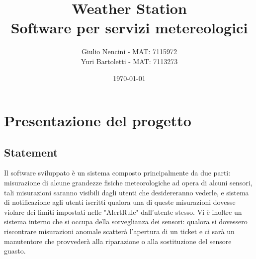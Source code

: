 \documentclass[a4paper, 11pt]{article}
\title{Weather Station
\\Software per servizi metereologici}
\author{Giulio Nencini - MAT: 7115972
\\Yuri Bartoletti - MAT: 7113273}
\date{\today}
\begin{document}
	\newpage
	\maketitle
	\tableofcontents

	\newpage
	\section{Presentazione del progetto}
	\subsection{Statement}
	Il software sviluppato è un sistema composto principalmente da due parti: misurazione di alcune grandezze fisiche meteorologiche ad opera di alcuni sensori, tali misurazioni saranno visibili dagli utenti che desidereranno vederle, e sistema di notificazione agli utenti iscritti qualora una di queste misurazioni dovesse violare dei limiti impostati nelle "AlertRule" dall'utente stesso. Vi è inoltre un sistema interno che si occupa della sorveglianza dei sensori: qualora si dovessero riscontrare misurazioni anomale scatterà l'apertura di un ticket e ci sarà un manutentore che provvederà alla riparazione o alla sostituzione del sensore guasto.
\end{document}
